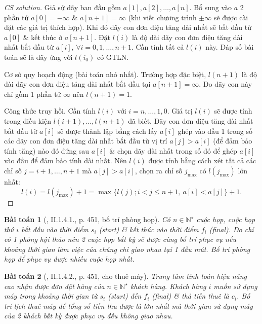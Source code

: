 \documentclass{article}
\newtheorem{baitoan}{Bài toán}
\begin{document}
\begin{proof}[CS solution]
	Giả sử dãy ban đầu gồm $a[1],a[2],\ldots,a[n]$. Bổ sung vào $a$ 2 phần tử $a[0] = -\infty$ \& $a[n + 1] = \infty$ (khi viết chương trình $\pm\infty$ sẽ được cài đặt các giá trị thích hợp). Khi đó dãy con đơn điệu tăng dài nhất sẽ bắt đầu từ $a[0]$ \& kết thúc ở $a[n + 1]$. Đặt $l(i)$ là độ dài dãy con đơn điệu tăng dài nhất bắt đầu từ $a[i]$, $\forall i = 0,1,\ldots,n + 1$. Cần tính tất cả $l(i)$ này. Đáp số bài toán sẽ là dãy ứng với $l(i_0)$ có GTLN.
	
	{\sf Cơ sở quy hoạch động (bài toán nhỏ nhất).} Trường hợp đặc biệt, $l(n + 1)$ là độ dài dãy con đơn điệu tăng dài nhất bắt đầu tại $a[n + 1] = \infty$. Do dãy con này chỉ gồm 1 phần tử $\infty$ nên $l(n + 1) = 1$.
	
	{\sf Công thức truy hồi.} Cần tính $l(i)$ với $i = n,\ldots,1,0$. Giá trị $l(i)$ sẽ được tính trong điều kiện $l(i + 1),\ldots,l(n + 1)$ đã biết. Dãy con đơn điệu tăng dài nhất bắt đầu từ $a[i]$ sẽ được thành lập bằng cách lấy $a[i]$ ghép vào đầu 1 trong số các dãy con đơn điệu tăng dài nhất bắt đầu từ vị trí $a[j] > a[i]$ (để đảm bảo tính tăng) nào đó đứng sau $a[i]$ \& chọn dãy dài nhất trong số đó để ghép $a[i]$ vào đầu để đảm bảo tính dài nhất. Nên $l(i)$ được tính bằng cách xét tất cả các chỉ số $j = i + 1,\ldots,n + 1$ mà $a[j] > a[i]$, chọn ra chỉ số $j_{\max}$ có $l(j_{\max})$ lớn nhất:
	\begin{equation*}
		l(i) = l(j_{\max}) + 1 = \max\{l(j);i < j \le n + 1,\ a[i] < a[j]\} + 1.
	\end{equation*}
\end{proof}

\begin{baitoan}[\cite{Thu_Phuong_Tien_Triet_Phuong_KTLT}, II.1.4.1., p. 451, bố trí phòng họp]
	Có $n\in\mathbb{N}^\star$ cuộc họp, cuộc họp thứ $i$ bắt đầu vào thời điểm $s_i$ (start) \& kết thúc vào thời điểm $f_i$ (final). Do chỉ có 1 phòng hội thảo nên 2 cuộc họp bất kỳ sẽ được cùng bố trí phục vụ nếu khoảng thời gian làm việc của chúng chỉ giao nhau tại 1 đầu mút. Bố trí phòng họp để phục vụ được nhiều cuộc họp nhất.
\end{baitoan}

\begin{baitoan}[\cite{Thu_Phuong_Tien_Triet_Phuong_KTLT}, II.1.4.2., p. 451, cho thuê máy]
	Trung tâm tính toán hiệu năng cao nhận được đơn đặt hàng của $n\in\mathbb{N}^\star$ khách hàng. Khách hàng $i$ muốn sử dụng máy trong khoảng thời gian từ $s_i$ (start) đến $f_i$ (final) \& thả tiền thuê là $c_i$. Bố trí lịch thuê máy để tổng số tiền thu được là lớn nhất mà thời gian sử dụng máy của 2 khách bất kỳ được phục vụ đều không giao nhau.
\end{baitoan}
\end{document}
